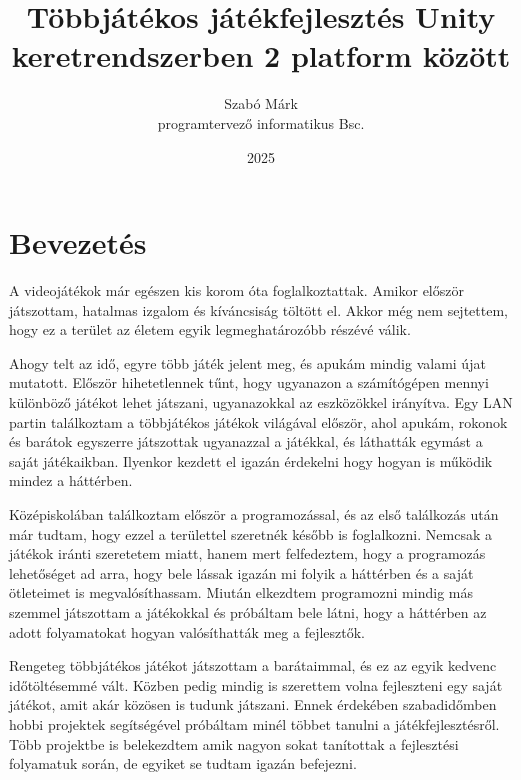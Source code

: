 \documentclass[]{thesis-ekf}
\theoremstyle{definition}
\theoremstyle{remark}
\begin{document}
\title{Többjátékos játékfejlesztés Unity keretrendszerben 2 platform között}
\author{Szabó Márk\\programtervező informatikus Bsc.}
\date{2025}
\maketitle

\tableofcontents

\chapter*{Bevezetés}

A videojátékok már egészen kis korom óta foglalkoztattak. Amikor először játszottam, hatalmas izgalom és kíváncsiság töltött el. Akkor még nem sejtettem, hogy ez a terület az életem egyik legmeghatározóbb részévé válik.

Ahogy telt az idő, egyre több játék jelent meg, és apukám mindig valami újat mutatott. Először hihetetlennek tűnt, hogy ugyanazon a számítógépen mennyi különböző játékot lehet játszani, ugyanazokkal az eszközökkel irányítva. Egy LAN partin találkoztam a többjátékos játékok világával először, ahol apukám, rokonok és barátok egyszerre játszottak ugyanazzal a játékkal, és láthatták egymást a saját játékaikban. Ilyenkor kezdett el igazán érdekelni hogy hogyan is működik mindez a háttérben. 

Középiskolában találkoztam először a programozással, és az első találkozás után már tudtam, hogy ezzel a területtel szeretnék később is foglalkozni. Nemcsak a játékok iránti szeretetem miatt, hanem mert felfedeztem, hogy a programozás lehetőséget ad arra, hogy bele lássak igazán mi folyik a háttérben és a saját ötleteimet is megvalósíthassam. Miután elkezdtem programozni mindig más szemmel játszottam a játékokkal és próbáltam bele látni, hogy a háttérben az adott folyamatokat hogyan valósíthatták meg a fejlesztők.

Rengeteg többjátékos játékot játszottam a barátaimmal, és ez az egyik kedvenc időtöltésemmé vált. Közben pedig mindig is szerettem volna fejleszteni egy saját játékot, amit akár közösen is tudunk játszani. Ennek érdekében szabadidőmben hobbi projektek segítségével próbáltam minél többet tanulni a játékfejlesztésről. Több projektbe is belekezdtem amik nagyon sokat tanítottak a fejlesztési folyamatuk során, de egyiket se tudtam igazán befejezni.
\end{document}
